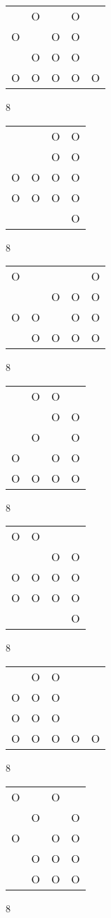\begin{tabular}{|m{0.2cm}m{0.2cm}m{0.2cm}m{0.2cm}m{0.2cm}|}\hline
 &O& &O& \\
O& &O&O& \\
 &O&O&O& \\
O&O&O&O&O\\
\hline\end{tabular}8
\begin{tabular}{|m{0.2cm}m{0.2cm}m{0.2cm}m{0.2cm}|}\hline
 & &O&O\\
 & &O&O\\
O&O&O&O\\
O&O&O&O\\
 & & &O\\
\hline\end{tabular}8
\begin{tabular}{|m{0.2cm}m{0.2cm}m{0.2cm}m{0.2cm}m{0.2cm}|}\hline
O& & & &O\\
 & &O&O&O\\
O&O& &O&O\\
 &O&O&O&O\\
\hline\end{tabular}8
\begin{tabular}{|m{0.2cm}m{0.2cm}m{0.2cm}m{0.2cm}|}\hline
 &O&O& \\
 & &O&O\\
 &O& &O\\
O& &O&O\\
O&O&O&O\\
\hline\end{tabular}8
\begin{tabular}{|m{0.2cm}m{0.2cm}m{0.2cm}m{0.2cm}|}\hline
O&O& & \\
 & &O&O\\
O&O&O&O\\
O&O&O&O\\
 & & &O\\
\hline\end{tabular}8
\begin{tabular}{|m{0.2cm}m{0.2cm}m{0.2cm}m{0.2cm}m{0.2cm}|}\hline
 &O&O& & \\
O&O&O& & \\
O&O&O& & \\
O&O&O&O&O\\
\hline\end{tabular}8
\begin{tabular}{|m{0.2cm}m{0.2cm}m{0.2cm}m{0.2cm}|}\hline
O& &O& \\
 &O& &O\\
O& &O&O\\
 &O&O&O\\
 &O&O&O\\
\hline\end{tabular}8
